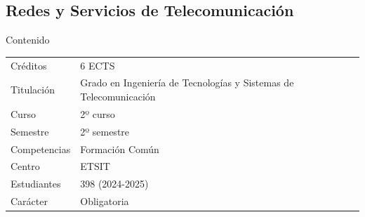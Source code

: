 \documentclass[xcolor=table,xcolor=x11names]{beamer}
\begin{document}
\subsection{Redes y Servicios de Telecomunicación}
\begin{frame}[allowframebreaks]{Contenido}
    \tableofcontents[currentsubsection]
\end{frame}
\begin{frame}{\subsecname}
    \begin{table}
        \begin{tabular}{ p{2cm} | p{7cm}}
            \toprule
            \rowcolor{upmblue!20}Créditos & 6 ECTS\\
            Titulación & Grado en Ingeniería de Tecnologías y Sistemas de Telecomunicación\\
            \rowcolor{upmblue!20}Curso & 2º curso\\
            Semestre & 2º semestre\\
            \rowcolor{upmblue!20}Competencias &  Formación Común\\
            Centro & ETSIT\\
            \rowcolor{upmblue!20}Estudiantes & 398 (2024-2025)\\
            Carácter & Obligatoria \\
            \bottomrule
        \end{tabular}
    \end{table}
\end{frame}
\end{document}
